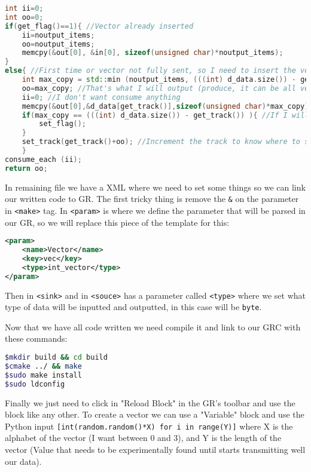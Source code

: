 \documentclass[a4paper, 10pt, conference]{ieeeconf}      %
\begin{document}
\begin{lstlisting}[language=c++, breaklines]
int ii=0;
int oo=0;
if(get_flag()==1){ //Vector already inserted
    ii=noutput_items;
    oo=noutput_items;
    memcpy(&out[0], &in[0], sizeof(unsigned char)*noutput_items);
}
else{ //First time or vector not fully sent, so I need to insert the vector
    int max_copy = std::min (noutput_items, (((int) d_data.size()) - get_track()) ); //Check for space in buffers to use the remaining vector (len(vec) - used)
    oo=max_copy; //That's what I will output (produce, it can be all vector or all buffer)
    ii=0; //I don't want consume anything
    memcpy(&out[0],&d_data[get_track()],sizeof(unsigned char)*max_copy); //Output starting from where I stopped the last time (Starting with 0)
    if(max_copy == (((int) d_data.size()) - get_track()) ){ //If I will use last piece of the vector (len(vec)-used) then I can set the flag to get out. (Start passing directly)
        set_flag();
    }
    set_track(get_track()+oo); //Increment the track to know where to start copying the vector the next time (Where I was plus what I will produce now) 
    }
consume_each (ii);
return oo;
\end{lstlisting}

    In remaining file we have a XML where we need to set some things so we can link our written code to GR. The first tricky thing is remove the \verb|&| on the parameter in \verb|<make>| tag. 
    In \verb|<param>| is where we define the parameter that will be parsed in our GR, so we will replace this piece of the template for this:
\begin{lstlisting}[language=xml, breaklines]
<param>
    <name>Vector</name>
    <key>vec</key>
    <type>int_vector</type>
</param>
\end{lstlisting}
    Then in \verb|<sink>| and in \verb|<souce>| has a parameter called \verb|<type>| where we set what type of data will be inputted and outputted, in this case will be \verb|byte|.

    Now that we have all code written we need compile it and link to our GRC with these commands:
    
\begin{lstlisting}[language=bash, breaklines]
$mkdir build && cd build
$cmake ../ && make
$sudo make install
$sudo ldconfig
\end{lstlisting}
    
    Finally we just need to click in "Reload Block" in the GR's toolbar and use the block like any other. To create a vector we can use a "Variable" block and use the Python input \verb|[int(random.random()*X) for i in range(Y)]| where X is the alphabet of the vector (I want between 0 and 3), and Y is the length of the vector (Value that needs to be experimentally found until starts transmitting well our data).
    
\end{document}

